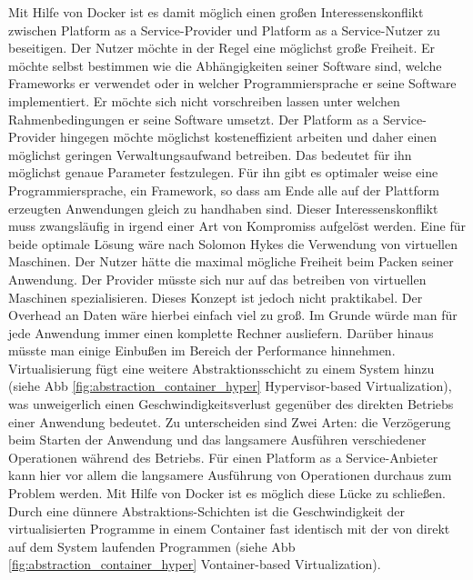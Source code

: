 Mit Hilfe von Docker ist es damit möglich einen großen Interessenskonflikt zwischen Platform as a Service-Provider und Platform as a Service-Nutzer zu beseitigen.
Der Nutzer möchte in der Regel eine möglichst große Freiheit. Er möchte selbst bestimmen wie die Abhängigkeiten seiner Software sind, welche Frameworks er verwendet oder in welcher Programmiersprache er seine Software implementiert. Er möchte sich nicht vorschreiben lassen unter welchen Rahmenbedingungen er seine Software umsetzt. Der Platform as a Service-Provider hingegen möchte möglichst kosteneffizient arbeiten und daher einen möglichst geringen Verwaltungsaufwand betreiben. Das bedeutet für ihn möglichst genaue Parameter festzulegen. Für ihn gibt es optimaler weise eine Programmiersprache, ein Framework, so dass am Ende alle auf der Plattform erzeugten Anwendungen gleich zu handhaben sind. Dieser Interessenskonflikt muss zwangsläufig in irgend einer Art von Kompromiss aufgelöst werden.
Eine für beide optimale Lösung wäre nach Solomon Hykes \cite[Zeit 13:50]{hykes_introduction_2013} die Verwendung von virtuellen Maschinen. Der Nutzer hätte die maximal mögliche Freiheit beim Packen seiner Anwendung. Der Provider müsste sich nur auf das betreiben von virtuellen Maschinen spezialisieren. Dieses Konzept ist jedoch nicht praktikabel. Der Overhead an Daten wäre hierbei einfach viel zu groß. Im Grunde würde man für jede Anwendung immer einen komplette Rechner ausliefern. Darüber hinaus müsste man einige Einbußen im Bereich der Performance hinnehmen.
\glqq Virtualisierung fügt eine weitere Abstraktionsschicht zu einem System hinzu (siehe Abb \ref{fig:abstraction_container_hyper} Hypervisor-based Virtualization), was unweigerlich einen Geschwindigkeitsverlust gegenüber des direkten Betriebs einer Anwendung bedeutet. Zu unterscheiden sind Zwei Arten: die Verzögerung beim Starten der Anwendung und das langsamere Ausführen verschiedener Operationen während des Betriebs.\grqq \cite[Seite 4]{schroder_container-virtualisierung_2014}
Für einen Platform as a Service-Anbieter kann hier vor allem die langsamere Ausführung von Operationen durchaus zum Problem werden.
Mit Hilfe von Docker ist es möglich diese Lücke zu schließen. Durch eine dünnere Abstraktions-Schichten ist die Geschwindigkeit der virtualisierten Programme in einem Container fast identisch mit der von direkt auf dem System laufenden Programmen (siehe Abb \ref{fig:abstraction_container_hyper} Vontainer-based Virtualization).\cite{schroder_container-virtualisierung_2014}
